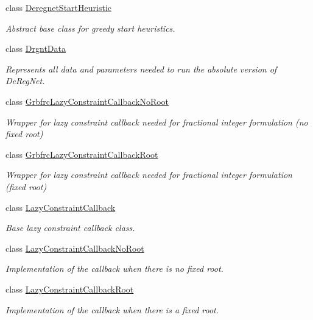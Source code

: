 \begin{DoxyCompactItemize}
class \hyperlink{classderegnet_1_1DeregnetStartHeuristic}{Deregnet\+Start\+Heuristic}
\begin{DoxyCompactList}\small\item\em Abstract base class for greedy start heuristics. \end{DoxyCompactList}\item 
class \hyperlink{classderegnet_1_1DrgntData}{Drgnt\+Data}
\begin{DoxyCompactList}\small\item\em Represents all data and parameters needed to run the absolute version of De\+Reg\+Net. \end{DoxyCompactList}\item 
class \hyperlink{classderegnet_1_1GrbfrcLazyConstraintCallbackNoRoot}{Grbfrc\+Lazy\+Constraint\+Callback\+No\+Root}
\begin{DoxyCompactList}\small\item\em Wrapper for lazy constraint callback needed for fractional integer formulation (no fixed root) \end{DoxyCompactList}\item 
class \hyperlink{classderegnet_1_1GrbfrcLazyConstraintCallbackRoot}{Grbfrc\+Lazy\+Constraint\+Callback\+Root}
\begin{DoxyCompactList}\small\item\em Wrapper for lazy constraint callback needed for fractional integer formulation (fixed root) \end{DoxyCompactList}\item 
class \hyperlink{classderegnet_1_1LazyConstraintCallback}{Lazy\+Constraint\+Callback}
\begin{DoxyCompactList}\small\item\em Base lazy constraint callback class. \end{DoxyCompactList}\item 
class \hyperlink{classderegnet_1_1LazyConstraintCallbackNoRoot}{Lazy\+Constraint\+Callback\+No\+Root}
\begin{DoxyCompactList}\small\item\em Implementation of the callback when there is no fixed root. \end{DoxyCompactList}\item 
class \hyperlink{classderegnet_1_1LazyConstraintCallbackRoot}{Lazy\+Constraint\+Callback\+Root}
\begin{DoxyCompactList}\small\item\em Implementation of the callback when there is a fixed root. \end{DoxyCompactList}\item 

\end{DoxyCompactItemize}

